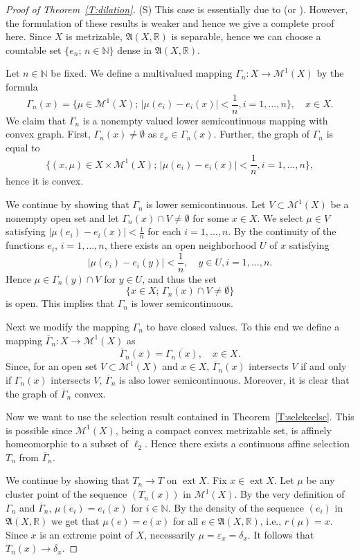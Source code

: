 \documentclass{amsart}
\numberwithin{equation}{section}
\theoremstyle{definition}
\def\fra{\mathfrak{A}}
\def\M{\mathcal M}
\def\ep{\varepsilon}
\def\en{\mathbb N}
\def\er{\mathbb R}
\def\ov{\overline}
\def \ext {\operatorname{ext}}
\newcommand{\abs}[1]{\left| #1  \right|}
\newcommand{\setsep}{;\,}
\begin{document}
\begin{proof}[Proof of Theorem~\ref{T:dilation}]
(S) This case is essentially due to \cite[Theorem 6.6]{lmnss03} (or \cite[Theorem 11.26]{lmns}). However, the formulation of these results is weaker and hence we give a complete proof here.
Since $X$ is metrizable, $\fra(X,\er)$ is separable, hence we can choose a countable set $\{e_n\setsep n\in\en\}$ dense in $\fra(X,\er)$.

Let $n\in\en$ be fixed. We define a multivalued mapping $\Gamma_n\colon X\to \M^1(X)$ by the formula
\[
\Gamma_n(x)=\{\mu\in \M^1(X) \setsep \abs{\mu(e_i)-e_i(x)}<\frac1n, i=1,\dots, n\},\quad x\in  X.
\]
We claim that $\Gamma_n$ is a nonempty valued lower semicontinuous mapping with convex graph. First, $\Gamma_n(x)\ne\emptyset$ as $\ep_x\in\Gamma_n(x)$. Further, the graph of $\Gamma_n$ is equal to
$$\{(x,\mu)\in X\times \M^1(X)\setsep  \abs{\mu(e_i)-e_i(x)}<\frac1n, i=1,\dots, n\},$$
hence it is convex.

We continue by showing that $\Gamma_n$ is lower semicontinuous.
Let $V\subset \M^1(X)$ be a nonempty open set and let $\Gamma_n(x)\cap V\neq \emptyset$ for some $x\in X$.
We select $\mu\in V$ satisfying $\abs{\mu(e_i)-e_i(x)}<\frac1n$ for each $i=1,\dots, n$. By the continuity of the functions $e_i$, $i=1,\dots,n$, there exists an open  neighborhood $U$ of $x$ satisfying
\[
\abs{\mu(e_i)-e_i(y)}<\frac1n,\quad y\in U, i=1,\dots,n.
\]
Hence $\mu\in \Gamma_n(y)\cap V$ for $y\in U$, and thus the set
\[
\{x\in X\setsep \Gamma_n(x)\cap V\neq\emptyset\}
\]
is open. This implies that $\Gamma_n$ is lower semicontinuous.

Next we modify the mapping $\Gamma_n$ to have closed values. To this end
we define a mapping $\ov{\Gamma}_n\colon X\to \M^1(X)$ as
\[
\ov{\Gamma}_n(x)=\ov{\Gamma_n(x)},\quad x\in X.
\]
Since, for an open set $V\subset \M^1(X)$ and $x\in X$, $\ov{\Gamma}_n(x)$ intersects $V$ if and only if $\Gamma_n(x)$ intersects $V$, $\ov{\Gamma}_n$ is also lower semicontinuous. Moreover, it is clear that the graph of $\ov{\Gamma}_n$ convex.

Now we want to use the selection result contained in Theorem~\ref{T:selekcelsc}. This is possible
since $\M^1(X)$, being a compact convex metrizable set, is affinely homeomorphic to a subset of $\ell_2$.
Hence there exists a continuous  affine selection $T_n$ from $\ov{\Gamma}_n$.

We continue by showing that $T_n\to T$ on $\ext X$. Fix $x\in \ext X$. Let $\mu$ be any cluster point of the sequence $(T_n(x))$ in $\M^1(X)$. By the very definition of $\Gamma_n$ and $\ov{\Gamma}_n$, $\mu(e_i)=e_i(x)$ for $i\in\en$. By the density of the sequence $(e_i)$ in $\fra(X,\er)$ we get that
$\mu(e)=e(x)$ for all $e\in \fra(X,\er)$, i.e., $r(\mu)=x$. Since $x$ is an extreme point of $X$, necessarily $\mu=\ep_{x}=\delta_x$. It follows that $T_n(x)\to \delta_x$.



\end{proof}
\end{document}
